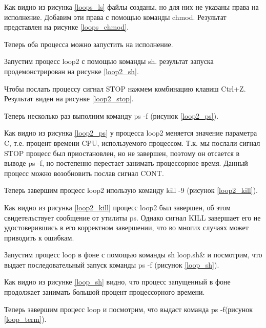 Как видно из рисунка \ref{loops_ls} файлы созданы, но для них не указаны права на исполнение. Добавим эти права с помощью команды chmod. Результат представлен на рисунке \ref{loops_chmod}.


Теперь оба процесса можно запустить на исполнение.

Запустим процесс loop2 с помощью команды sh. результат запуска продемонстрирован на рисунке
\ref{loop2_sh}.

Чтобы послать процессу сигнал STOP нажмем комбинацию клавиш Ctrl+Z. Результат виден на рисунке \ref{loop2_stop}.


Теперь несколько раз выполним команду ps -f (рисунок \ref{loop2_ps}).


Как видно из рисунка \ref{loop2_ps} у процесса loop2 меняется значение параметра C, т.е. процент времени CPU, используемого процессом. Т.к. мы послали сигнал STOP процесс был приостановлен, но не завершен, поэтому он отсается в выводе ps -f, но постепенно перестает занимать процессорное время. Данный процесс можно возобновить послав сигнал CONT.

Теперь завершим процесс loop2 ипользую команду kill -9 (рисунок \ref{loop2_kill}).


Как видно из рисунка \ref{loop2_kill} процесс loop2 был завершен, об этом свидетельствует сообщение от утилиты ps. Однако сигнал KILL завершает его не удостоверившись в его корректном завершении, что во многих случаях может приводить к ошибкам.

Запустим процесс loop в фоне с помощью команды sh loop.sh\& и посмотрим, что выдает последовательный запуск команды ps -f (рисунок \ref{loop_sh}).


Как видно из рисунке \ref{loop_sh} видно, что процесс запущенный в фоне продолжает занимать большой процент процессорного времени.

Теперь завершим процесс loop и посмотрим, что выдаст команда ps -f(рисунок \ref{loop_term}).


